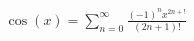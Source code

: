 \documentclass[preview]{standalone}
\begin{document}
\begin{align*}
\cos(x) = \sum_{n=0}^{\infty} \frac{(-1)^n x^{2n+!}}{(2n+1)!}
\end{align*}
\end{document}

